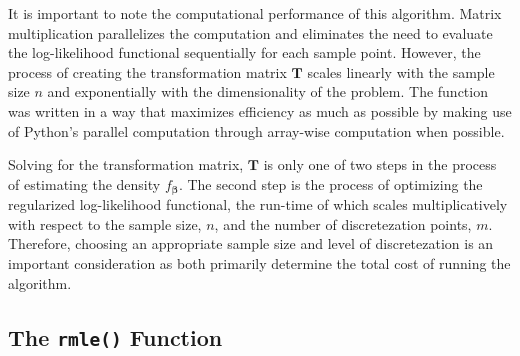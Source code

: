 \documentclass[a4paper,12pt]{article}
\newcommand{\bbeta}{{\boldsymbol{\beta}}}
\begin{document}
It is important to note the computational performance of this algorithm. Matrix multiplication parallelizes the computation and eliminates the need to evaluate the log-likelihood functional sequentially for each sample point. However, the process of creating the transformation matrix $\mathbf{T}$ scales linearly with the sample size $n$ and exponentially with the dimensionality of the problem. The function was written in a way that maximizes efficiency as much as possible by making use of Python's parallel computation through array-wise computation when possible. 

Solving for the transformation matrix, $\mathbf{T}$ is only one of two steps in the process of estimating the density $f_\bbeta$. The second step is the process of optimizing the regularized log-likelihood functional, the run-time of which scales multiplicatively with respect to the sample size, $n$, and the number of discretezation points, $m$. Therefore, choosing an appropriate sample size and level of discretezation is an important consideration as both primarily determine the total cost of running the algorithm.

\subsection{The \texttt{rmle()} Function}\label{sec:rmle_func}
\end{document}
